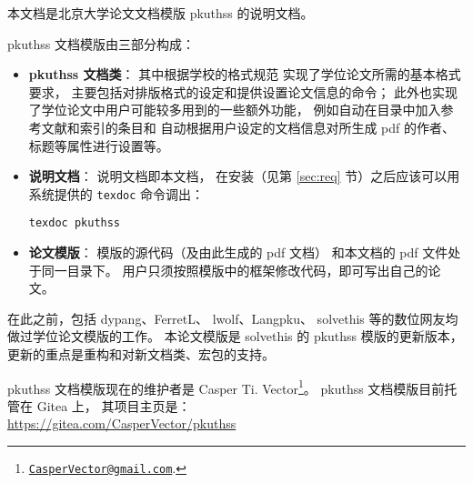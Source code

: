 %
%
%
%


本文档是北京大学论文文档模版 pkuthss 的说明文档。

pkuthss 文档模版由三部分构成：
\begin{itemize}
	\item \textbf{pkuthss 文档类}：
		其中根据学校的格式规范%
		实现了学位论文所需的基本格式要求，
		主要包括对排版格式的设定和提供设置论文信息的命令；
		此外也实现了学位论文中用户可能较多用到的一些额外功能，
		例如自动在目录中加入参考文献和索引的条目和
		自动根据用户设定的文档信息对所生成 pdf 的作者、标题等属性进行设置等。
	\item \textbf{说明文档}：
		说明文档即本文档，
		在安装（见第 \ref{sec:req} 节）之后应该可以用  系统提供的
		\verb|texdoc| 命令调出：
\begin{Verbatim}
texdoc pkuthss
\end{Verbatim}
	\item \textbf{论文模版}：
		模版的源代码（及由此生成的 pdf 文档）
		和本文档的 pdf 文件处于同一目录下。
		用户只须按照模版中的框架修改代码，即可写出自己的论文。
\end{itemize}

在此之前，包括 dypang、FerretL\supercite{FerretL}、%
lwolf、Langpku\supercite{Langpku}、%
solvethis 等的数位网友均做过学位论文模版的工作。
本论文模版是 solvethis 的 pkuthss 模版的更新版本，
更新的重点是重构和对新文档类、宏包的支持。

pkuthss 文档模版现在的维护者是 Casper Ti. Vector\footnote%
{\href{mailto:CasperVector@gmail.com}{\texttt{CasperVector@gmail.com}}.}。%
pkuthss 文档模版目前托管在 Gitea 上，
其项目主页是：\\
\hspace*{\parindent}\url{https://gitea.com/CasperVector/pkuthss}

